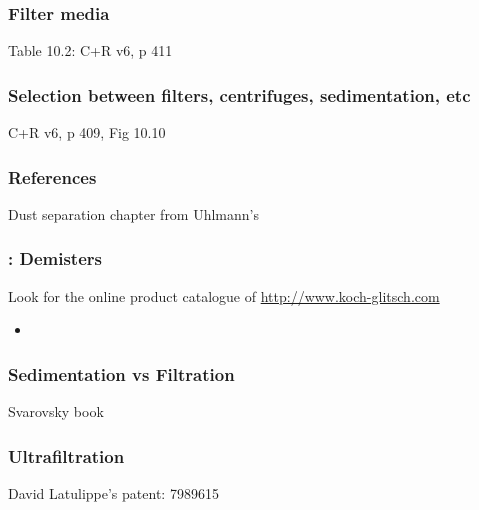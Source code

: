 
\begin{frame}\frametitle{Filter media}
	Table 10.2: C+R v6, p 411
\end{frame}

\begin{frame}\frametitle{Selection between filters, centrifuges, sedimentation, etc}
	C+R v6, p 409, Fig 10.10	
\end{frame}

\begin{frame}\frametitle{References}
	Dust separation chapter from Uhlmann's 
\end{frame}

\begin{frame}\frametitle{{\color{myGreen}{Quick}}: Demisters}
	Look for the online product catalogue of \href{http://www.koch-glitsch.com}{http://www.koch-glitsch.com}
	
	\begin{itemize}
		\item	
	\end{itemize}
\end{frame}

\begin{frame}\frametitle{Sedimentation vs Filtration}
	Svarovsky book
\end{frame}

\begin{frame}\frametitle{Ultrafiltration}
	David Latulippe's patent: 7989615
	
\end{frame}